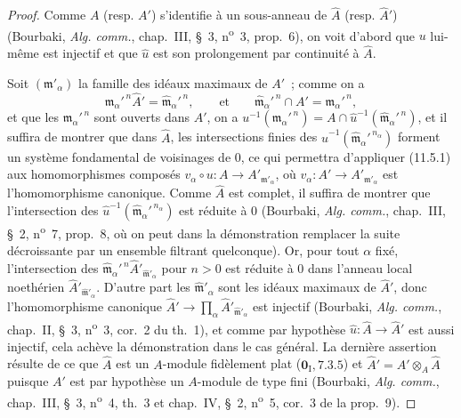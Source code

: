 \begin{proof}

Comme $A$ (resp. $A'$) s'identifie à un sous-anneau de $\widehat A$ (resp.
$\widehat{A}'$) (Bourbaki, \emph{Alg. comm.}, chap.~III, \S~3, n\textsuperscript{o}~3,
prop.~6), on voit d'abord que $u$ lui-même est injectif et que $\widehat u$ est
son prolongement par continuité à $\widehat A$.

Soit $(\mathfrak m'_\alpha)$ la famille des idéaux maximaux de $A'$~; comme on a
\[
\mathfrak m_\alpha'^{\,n}\widehat{A}'
=\widehat{\mathfrak m}_\alpha'^{\,n},
\qquad\text{et}\qquad
\widehat{\mathfrak m}_\alpha'^{\,n}\cap A'
=\mathfrak m_\alpha'^{\,n},
\]
et que les $\mathfrak m_\alpha'^{\,n}$ sont ouverts dans $A'$, on a
$u^{-1}(\mathfrak m_\alpha'^{\,n})
=A\cap\widehat u^{-1}(\widehat{\mathfrak m}_\alpha'^{\,n})$, et il suffira de
montrer que dans $\widehat A$, les intersections finies des
$\widehat u^{-1}(\widehat{\mathfrak m}_\alpha'^{\,n_\alpha})$ forment un système
fondamental de voisinages de $0$, ce qui permettra d'appliquer (11.5.1) aux
homomorphismes composés $v_\alpha\circ u:A\to A'_{\mathfrak m'_\alpha}$,
où $v_\alpha:A'\to A'_{\mathfrak m'_\alpha}$ est l'homomorphisme canonique.
Comme $\widehat A$ est complet, il suffira de montrer que l'intersection des
$\widehat u^{-1}(\widehat{\mathfrak m}_\alpha'^{\,n_\alpha})$ est réduite à
$0$ (Bourbaki, \emph{Alg. comm.}, chap.~III, \S~2, n\textsuperscript{o}~7, prop.~8, où on
peut dans la démonstration remplacer la suite décroissante par un ensemble
filtrant quelconque). Or, pour tout $\alpha$
fixé, l'intersection des
$\widehat{\mathfrak m}_\alpha'^{\,n}\widehat{A}'_{\widehat{\mathfrak m}'_\alpha}$
pour $n>0$ est réduite à $0$ dans l'anneau local noethérien
$\widehat{A}'_{\widehat{\mathfrak m}'_\alpha}$. D'autre part les
$\widehat{\mathfrak m}'_\alpha$ sont les idéaux maximaux de $\widehat{A}'$, donc
l'homomorphisme canonique
$\widehat{A}'\to\prod_\alpha\widehat{A}'_{\widehat{\mathfrak m}'_\alpha}$ est
injectif (Bourbaki, \emph{Alg. comm.}, chap.~II, \S~3, n\textsuperscript{o}~3, cor.~2 du
th.~1), et comme par hypothèse $\widehat u:\widehat A\to\widehat{A}'$ est aussi
injectif, cela achève la démonstration dans le cas général. La dernière
assertion résulte de ce que $\widehat A$ est un $A$-module fidèlement plat
($\mathbf 0_{\mathrm I},7.3.5$) et $\widehat{A}'=A'\otimes_A\widehat A$ puisque
$A'$ est par hypothèse un $A$-module de type fini (Bourbaki, \emph{Alg. comm.},
chap.~III, \S~3, n\textsuperscript{o}~4, th.~3 et chap.~IV, \S~2, n\textsuperscript{o}~5, cor.~3 de la
prop.~9).
\end{proof}

